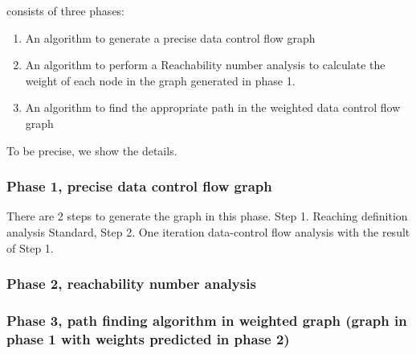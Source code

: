 {\THESYSTEM} consists of three phases: 
\begin{enumerate}
    \item An algorithm to generate a precise data control flow graph
    \item An algorithm to perform a Reachability number analysis to calculate the weight of each node in the graph generated in phase 1.
    \item An algorithm to find the appropriate path in the weighted data control flow graph
\end{enumerate}

To be precise, we show the details. 
\subsubsection{Phase 1, precise data control flow graph}
There are 2 steps to generate the graph in this phase.
Step 1. Reaching definition analysis
   Standard, 
Step 2. One iteration data-control flow analysis with the result of Step 1.

\subsubsection{Phase 2, reachability number analysis}

\subsubsection{Phase 3, path finding algorithm in weighted graph (graph in phase 1 with weights predicted in phase 2) }